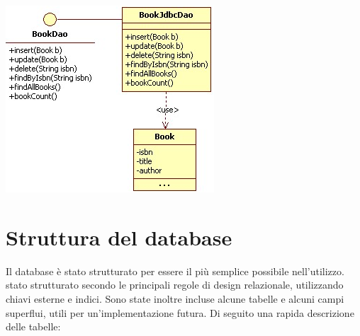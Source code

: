 \begin{center}
\includegraphics[width=0.3\linewidth]{img/dao}
\end{center}

\section{Struttura del database}

Il database è stato strutturato per essere il più semplice possibile nell'utilizzo. \E stato strutturato secondo le principali regole di design relazionale, utilizzando chiavi esterne e indici. Sono state inoltre incluse alcune tabelle e alcuni campi superflui, utili per un'implementazione futura. Di seguito una rapida descrizione delle tabelle:
